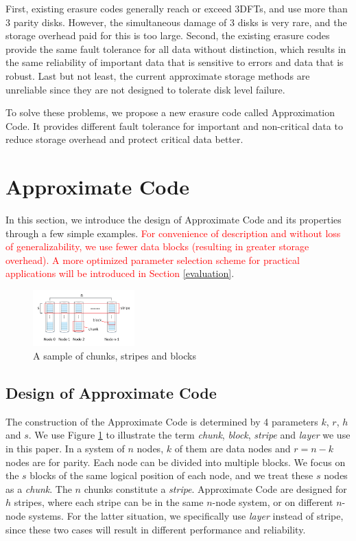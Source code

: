 \documentclass[sigconf]{acmart}
\begin{document}
First, existing erasure codes generally reach or exceed 3DFTs, and use more than 3 parity disks. However, the simultaneous damage of 3 disks is very rare, and the storage overhead paid for this is too large. Second, the existing erasure codes provide the same fault tolerance for all data without distinction, which results in the same reliability of important data that is sensitive to errors and data that is robust. Last but not least, the current approximate storage methods are unreliable since they are not designed to tolerate disk level failure.

To solve these problems, we propose a new erasure code called Approximation Code. It provides different fault tolerance for important and non-critical data to reduce storage overhead and protect critical data better.

\section{Approximate Code}\label{ApCode}
In this section, we introduce the design of Approximate Code and its properties through a few simple examples. 
\textcolor{red}{For convenience of description and without loss of generalizability, we use fewer data blocks (resulting in greater storage overhead). A more optimized parameter selection scheme for practical applications will be introduced in Section} \ref{evaluation}.
 

\begin{figure}[ht]
\centering
\includegraphics[width=0.35\textwidth]{photo/chunk-block.pdf}
\caption{A sample of chunks, stripes and blocks}
\label{fig-chunk-block}
\end{figure}


\subsection{Design of Approximate Code}
The construction of the Approximate Code is determined by 4 parameters $k$, $r$, $h$ and $s$. 
We use Figure \ref{fig-chunk-block} to illustrate the term \emph{chunk}, \emph{block}, \emph{stripe} and \emph{layer} we use in this paper. In a system of $n$ nodes, $k$ of them are data nodes and $r=n-k$ nodes are for parity. Each node can be divided into multiple blocks. We focus on the $s$ blocks of the same logical position of each node, and we treat these $s$ nodes as a \emph{chunk}. The $n$ chunks constitute a \emph{stripe}. Approximate Code are designed for $h$ stripes, where each stripe can be in the same $n$-node system, or on different $n$-node systems.
For the latter situation, we specifically use \emph{layer} instead of stripe, since these two cases will result in different performance and reliability.
\end{document}
